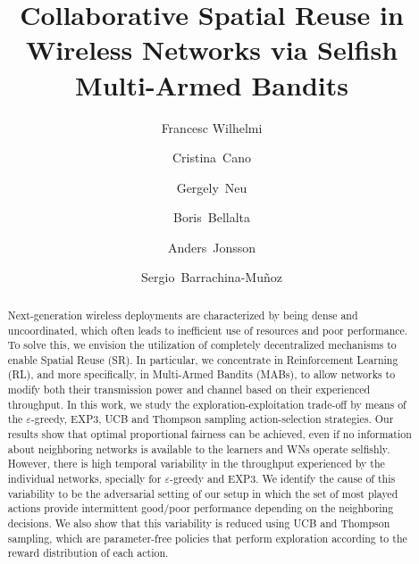 \documentclass[preprint,12pt]{elsarticle}
\begin{document}
\begin{frontmatter}



\title{Collaborative Spatial Reuse in Wireless Networks via Selfish Multi-Armed Bandits}

\author[label1, label4]{Francesc Wilhelmi}
\author[label2]{Cristina~Cano}
\author[label3]{Gergely~Neu}
\author[label1]{Boris~Bellalta} 
\author[label3]{Anders~Jonsson}
\author[label1]{Sergio~Barrachina-Mu\~noz}
\address[label1]{Wireless Networking Research Group (WN-UPF), 08002 Barcelona, Spain}
\address[label2]{Wireless Networks Research Group (WINE-UOC), 08860 Castelldefels (Barelona), Spain}
\address[label3]{Artificial Intelligence and Machine Learning Research Group (AIML-UPF), 08002 Barcelona, Spain}

\begin{abstract}
Next-generation wireless deployments are characterized by being dense and uncoordinated, which often leads to inefficient use of resources and poor performance. To solve this, we envision the utilization of completely decentralized mechanisms to enable Spatial Reuse (SR). In particular, we concentrate in Reinforcement Learning (RL), and more specifically, in Multi-Armed Bandits (MABs), to allow networks to modify both their transmission power and channel based on their experienced throughput. In this work, we study the exploration-exploitation trade-off by means of the $\varepsilon$-greedy, EXP3, UCB and Thompson sampling action-selection strategies. Our results show that optimal proportional fairness can be achieved, even if no information about neighboring networks is available to the learners and WNs operate selfishly. However, there is high temporal variability in the throughput experienced by the individual networks, specially for $\varepsilon$-greedy and EXP3. We identify the cause of this variability to be the adversarial setting of our setup in which the set of most played actions provide intermittent good/poor performance depending on the neighboring decisions. We also show that this variability is reduced using UCB and Thompson sampling, which are parameter-free policies that perform exploration according to the reward distribution of each action.
\end{abstract}


\end{frontmatter}
\end{document}
